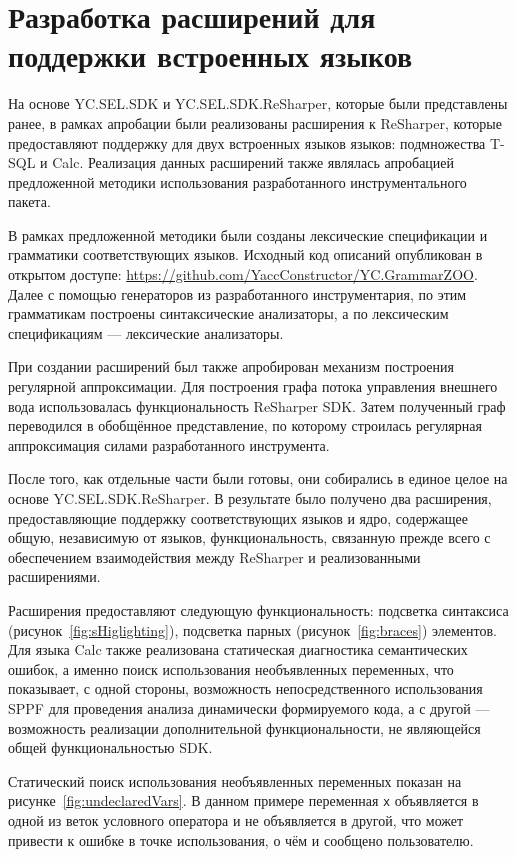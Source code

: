 \section{Разработка расширений для поддержки встроенных языков}

На основе YC.SEL.SDK и YC.SEL.SDK.ReSharper, которые были представлены ранее, в рамках апробации были реализованы расширения к ReSharper, которые предоставляют поддержку для  двух встроенных языков языков: подмножества T-SQL и Calc. Реализация данных расширений также являлась апробацией предложенной методики использования разработанного инструментального пакета.

В рамках предложенной методики были созданы лексические спецификации и грамматики соответствующих языков. Исходный код описаний опубликован в открытом доступе: \url{https://github.com/YaccConstructor/YC.GrammarZOO}. Далее с помощью генераторов из разработанного инструментария, по этим грамматикам построены синтаксические анализаторы, а по лексическим спецификациям --- лексические анализаторы.

При создании расширений был также апробирован механизм построения регулярной аппроксимации. Для построения графа потока управления внешнего вода использовалась функциональность ReSharper SDK. Затем полученный граф переводился в обобщённое представление, по которому строилась регулярная аппроксимация силами разработанного инструмента.

После того, как отдельные части были готовы, они собирались в единое целое на основе YC.SEL.SDK.ReSharper. В результате было получено два расширения, предоставляющие поддержку соответствующих языков и ядро, содержащее общую, независимую от языков, функциональность, связанную прежде всего с обеспечением взаимодействия между ReSharper и реализованными расширениями.

Расширения предоставляют следующую функциональность: подсветка синтаксиса (рисунок~\ref{fig:sHiglighting}), подсветка парных (рисунок~\ref{fig:braces}) элементов. Для языка Calc также реализована статическая диагностика семантических ошибок, а именно поиск использования необъявленных переменных, что показывает, с одной стороны, возможность непосредственного использования SPPF для проведения анализа динамически формируемого кода, а с другой --- возможность реализации дополнительной функциональности, не являющейся общей функциональностью SDK.

Статический поиск использования необъявленных переменных показан на 
рисунке~\ref{fig:undeclaredVars}. В данном примере переменная \verb|x| объявляется в одной из веток условного оператора и не объявляется в другой, что может привести к ошибке в точке использования, о чём и сообщено пользователю.

